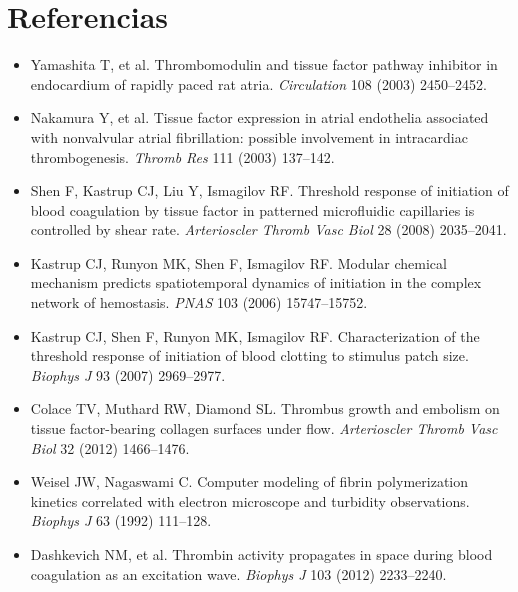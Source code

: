 \documentclass[11pt,a4paper]{article}
\begin{document}
\section*{Referencias}
\small
\begin{itemize}[leftmargin=1.2em,itemsep=1pt]
\item Yamashita T, et al. Thrombomodulin and tissue factor pathway inhibitor in
endocardium of rapidly paced rat atria. \emph{Circulation} 108 (2003) 2450--2452.
\item Nakamura Y, et al. Tissue factor expression in atrial endothelia associated
with nonvalvular atrial fibrillation: possible involvement in intracardiac
thrombogenesis. \emph{Thromb Res} 111 (2003) 137--142.
\item Shen F, Kastrup CJ, Liu Y, Ismagilov RF. Threshold response of initiation of
blood coagulation by tissue factor in patterned microfluidic capillaries is
controlled by shear rate. \emph{Arterioscler Thromb Vasc Biol} 28 (2008) 2035--2041.
\item Kastrup CJ, Runyon MK, Shen F, Ismagilov RF. Modular chemical mechanism
predicts spatiotemporal dynamics of initiation in the complex network of hemostasis.
\emph{PNAS} 103 (2006) 15747--15752.
\item Kastrup CJ, Shen F, Runyon MK, Ismagilov RF. Characterization of the threshold
response of initiation of blood clotting to stimulus patch size.
\emph{Biophys J} 93 (2007) 2969--2977.
\item Colace TV, Muthard RW, Diamond SL. Thrombus growth and embolism on tissue
factor-bearing collagen surfaces under flow. \emph{Arterioscler Thromb Vasc Biol}
32 (2012) 1466--1476.
\item Weisel JW, Nagaswami C. Computer modeling of fibrin polymerization kinetics
correlated with electron microscope and turbidity observations.
\emph{Biophys J} 63 (1992) 111--128.
\item Dashkevich NM, et al. Thrombin activity propagates in space during blood
coagulation as an excitation wave. \emph{Biophys J} 103 (2012) 2233--2240.
\end{itemize}
\end{document}
